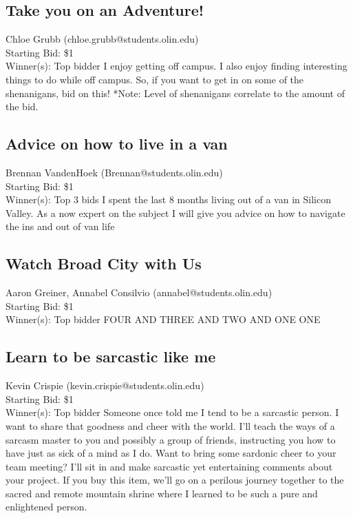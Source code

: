\documentclass[11pt]{article}
\begin{document}
\subsection{Take you on an Adventure!}
Chloe Grubb (chloe.grubb@students.olin.edu) \\
Starting Bid: \$1 \\
Winner(s): 
Top bidder\newline
I enjoy getting off campus. I also enjoy finding interesting things to do while off campus. So, if you want to get in on some of the shenanigans, bid on this! 
*Note: Level of shenanigans correlate to the amount of the bid.
\subsection{Advice on how to live in a van}
Brennan VandenHoek (Brennan@students.olin.edu) \\
Starting Bid: \$1 \\
Winner(s): 
Top 3 bids\newline
I spent the last 8 months living out of a van in Silicon Valley. As a now expert on the subject I will give you advice on how to navigate the ins and out of van life
\subsection{Watch Broad City with Us}
Aaron Greiner, Annabel Consilvio (annabel@students.olin.edu) \\
Starting Bid: \$1 \\
Winner(s): 
Top bidder\newline
FOUR AND THREE AND TWO AND ONE ONE
\subsection{Learn to be sarcastic like me}
Kevin Crispie (kevin.crispie@students.olin.edu) \\
Starting Bid: \$1 \\
Winner(s): 
Top bidder\newline
Someone once told me I tend to be a sarcastic person. I want to share that goodness and cheer with the world. I’ll teach the ways of a sarcasm master to you and possibly a group of friends, instructing you how to have just as sick of a mind as I do. Want to bring some sardonic cheer to your team meeting? I’ll sit in and make sarcastic yet entertaining comments about your project. If you buy this item, we’ll go on a perilous journey together to the sacred and remote mountain shrine where I learned to be such a pure and enlightened person.
\end{document}
